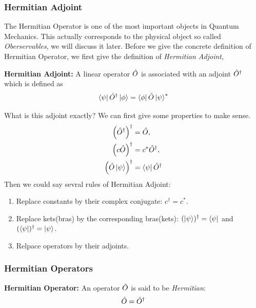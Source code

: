 \subsubsection{Hermitian Adjoint}
The Hermitian Operator is one of the most important objects in Quantum Mechanics. This actually corresponds to the physical object so called \emph{Oberservables}, we will discuss it later. Before we give the concrete definition of Hermitian Operator, we first give the definition of \emph{Hermitian Adjoint},
\begin{definition}{\textbf{Hermitian Adjoint:}}
    A linear operator $\hat{O}$ is associated with an adjoint $\hat{O}^ \dag$ which is defined as 
    \begin{eqnarray}
        \bra{\psi} \hat{O}^ \dag \ket{\phi} = \bra{\phi} \hat{O} \ket{\psi}^*
    \end{eqnarray}
\end{definition}
What is this adjoint exactly? We can first give some properties to make sense.
\begin{align}
    \left(\hat{O}^ \dag\right)^ \dag &= \hat{O}, \\
    \left(c \hat{O}\right)^ \dag &= c^* \hat{O}^ \dag, \\
    \left(\hat{O} \ket{\psi}\right)^ \dag &= \bra{\psi} \hat{O}^ \dag
\end{align}
Then we could say sevral rules of Hermitian Adjoint: 
\begin{enumerate}
    \item Replace constants by their complex conjugate: $c^ \dag = c^*$.
    \item Replace kets(bras) by the corresponding bras(kets): $(\ket{\psi})^ \dag = \bra{\psi}$ and $(\bra{\psi})^ \dag = \ket{\psi}$.
    \item Relpace operators by their adjoints.
\end{enumerate}
\subsubsection{Hermitian Operators}
\begin{definition}{\textbf{Hermitian Operator:}}
    An operator $\hat{O}$ is said to be \emph{Hermitian}: 
    \begin{eqnarray}
        \hat{O} = \hat{O}^ \dag
    \end{eqnarray}
\end{definition}

